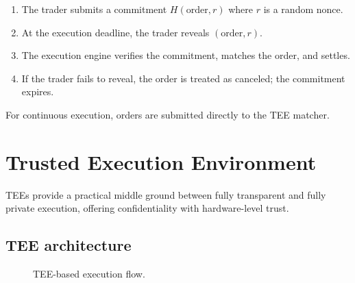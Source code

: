 \documentclass[11pt,a4paper]{article}
\begin{document}
\begin{enumerate}
  \item The trader submits a commitment $H(\text{order}, r)$ where $r$ is a random nonce.
  \item At the execution deadline, the trader reveals $(\text{order}, r)$.
  \item The execution engine verifies the commitment, matches the order, and settles.
  \item If the trader fails to reveal, the order is treated as canceled; the commitment expires.
\end{enumerate}

For continuous execution, orders are submitted directly to the TEE matcher.

\section{Trusted Execution Environment}
\label{sec:tee}

TEEs provide a practical middle ground between fully transparent and fully private execution, offering confidentiality with hardware-level trust.

\subsection{TEE architecture}

\begin{figure}[h]
  \centering
  \caption{TEE-based execution flow.}
  \label{fig:tee}
\end{figure}
\end{document}
